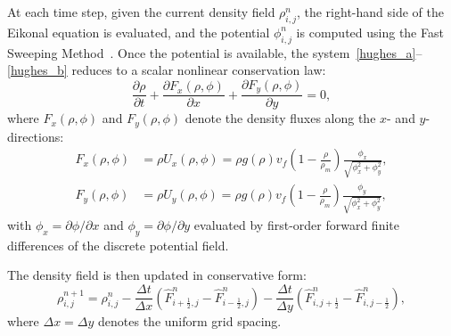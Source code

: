 \documentclass{article}
\begin{document}
At each time step, given the current density field \( \rho_{i,j}^n \), the right-hand side of the Eikonal equation is evaluated, and the potential \( \phi_{i,j}^n \) is computed using the Fast Sweeping Method~\cite{Zhao2004FastSweeping}. Once the potential is available, the system~\eqref{hughes_a}--\eqref{hughes_b} reduces to a scalar nonlinear conservation law:
\begin{equation}
    \frac{\partial \rho}{\partial t} + \frac{\partial F_x(\rho,\phi)}{\partial x} + \frac{\partial F_y(\rho,\phi)}{\partial y} = 0,
    \label{veldens_new}
\end{equation}
where \( F_x(\rho, \phi) \) and \( F_y(\rho, \phi) \) denote the density fluxes along the \( x \)- and \( y \)-directions:
\begin{align}
F_x(\rho, \phi) &= \rho U_x(\rho, \phi) = \rho g(\rho) v_f \left(1 - \frac{\rho}{\rho_m} \right) \frac{\phi_x}{\sqrt{\phi_x^2 + \phi_y^2}}, \label{eq:fluxes_x}\\
F_y(\rho, \phi) &= \rho U_y(\rho, \phi) = \rho g(\rho) v_f \left(1 - \frac{\rho}{\rho_m} \right) \frac{\phi_y}{\sqrt{\phi_x^2 + \phi_y^2}}, \label{eq:fluxes_y}
\end{align}
with $\phi_x = \partial \phi/\partial x$ and $\phi_y = \partial \phi/\partial y$ evaluated by first-order forward finite differences of the discrete potential field.

The density field is then updated in conservative form:
\begin{equation}
\rho_{i,j}^{n+1} = \rho_{i,j}^{n}
- \frac{\Delta t}{\Delta x} \left( \hat{F}_{i+\frac{1}{2},j}^n - \hat{F}_{i-\frac{1}{2},j}^n \right)
- \frac{\Delta t}{\Delta y} \left( \hat{F}_{i,j+\frac{1}{2}}^n - \hat{F}_{i,j-\frac{1}{2}}^n \right),
\label{eq:fv_update}
\end{equation}
where \( \Delta x = \Delta y \) denotes the uniform grid spacing.
\end{document}
